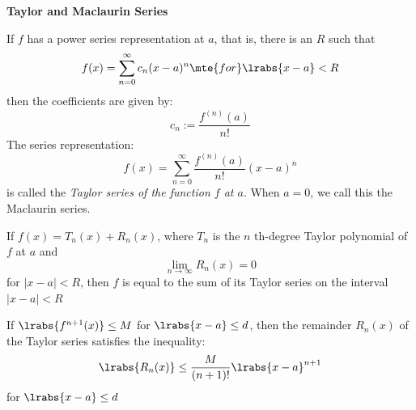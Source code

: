 
\chead{\today}
\graphicspath{ {\string~/Desktop} }
\usetikzlibrary{arrows}
\newcommand{\ans}[1]{ \noindent {\color{red} \textbf{Answer:} #1}}
\renewcommand{\ans}[1]{\vspace{3in}}

\begin{center}
\textbf{Taylor and Maclaurin Series}
\end{center}

\begin{thm}
	If $f$ has a power series representation at $a$, that is, there is an $R$ such that
	\[
		f(x) = \sum_{n = 0}^\infty c_n (x - a)^n \mte{ for } \lrabs{x - a} < R
	\]
	then the coefficients are given by:
	\[
			c_n := \frac{f^{(n)}(a)}{n!} 
	\]
	The series representation:
	\[
		f(x) = \sum_{n = 0}^\infty \frac{f^{(n)}(a)}{n!} (x-a)^n
	\]
	is called the \emph{Taylor series of the function $f$ at $a$}. When $a=0$, we call this the Maclaurin series.
\end{thm}
	


\begin{thm}
	If $f(x)=T_n(x)+R_n(x)$, where $T_n$ is the $n$ th-degree Taylor polynomial of $f$ at $a$ and
$$
\lim _{n \rightarrow \infty} R_n(x)=0
$$
for $|x-a|<R$, then $f$ is equal to the sum of its Taylor series on the interval $|x-a|<R$
\end{thm}

\begin{thm}
	If $\lrabs{f^{n+1}(x)} \leq M$ for $\lrabs{x-a} \leq d$, then the remainder $R_n(x)$ of the Taylor series satisfies the inequality:
	\[
		\lrabs{R_n(x)} \leq \frac{M}{(n+1)!} \lrabs{x-a}^{n+1}
	\]
	for $\lrabs{x-a} \leq d$
\end{thm}

